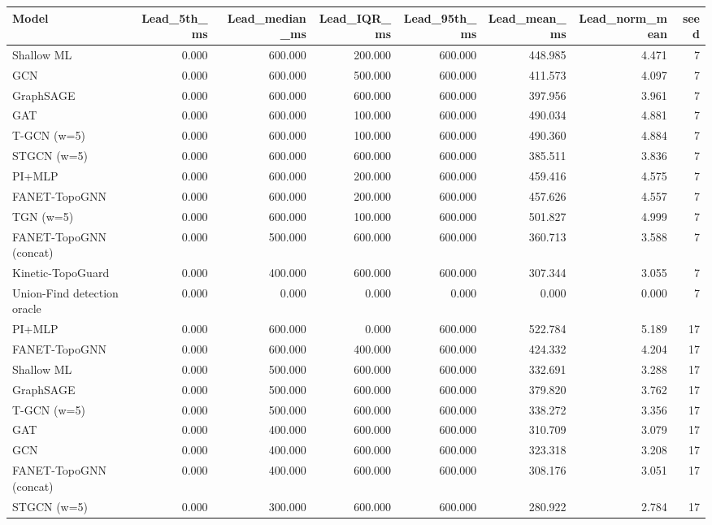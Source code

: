 \begin{tabular}{lrrrrrrr}
\toprule
Model & Lead\_5th\_ms & Lead\_median\_ms & Lead\_IQR\_ms & Lead\_95th\_ms & Lead\_mean\_ms & Lead\_norm\_mean & seed \\
\midrule
Shallow ML & 0.000 & 600.000 & 200.000 & 600.000 & 448.985 & 4.471 & 7 \\
GCN & 0.000 & 600.000 & 500.000 & 600.000 & 411.573 & 4.097 & 7 \\
GraphSAGE & 0.000 & 600.000 & 600.000 & 600.000 & 397.956 & 3.961 & 7 \\
GAT & 0.000 & 600.000 & 100.000 & 600.000 & 490.034 & 4.881 & 7 \\
T-GCN (w=5) & 0.000 & 600.000 & 100.000 & 600.000 & 490.360 & 4.884 & 7 \\
STGCN (w=5) & 0.000 & 600.000 & 600.000 & 600.000 & 385.511 & 3.836 & 7 \\
PI+MLP & 0.000 & 600.000 & 200.000 & 600.000 & 459.416 & 4.575 & 7 \\
FANET-TopoGNN & 0.000 & 600.000 & 200.000 & 600.000 & 457.626 & 4.557 & 7 \\
TGN (w=5) & 0.000 & 600.000 & 100.000 & 600.000 & 501.827 & 4.999 & 7 \\
FANET-TopoGNN (concat) & 0.000 & 500.000 & 600.000 & 600.000 & 360.713 & 3.588 & 7 \\
Kinetic-TopoGuard & 0.000 & 400.000 & 600.000 & 600.000 & 307.344 & 3.055 & 7 \\
Union-Find detection oracle & 0.000 & 0.000 & 0.000 & 0.000 & 0.000 & 0.000 & 7 \\
PI+MLP & 0.000 & 600.000 & 0.000 & 600.000 & 522.784 & 5.189 & 17 \\
FANET-TopoGNN & 0.000 & 600.000 & 400.000 & 600.000 & 424.332 & 4.204 & 17 \\
Shallow ML & 0.000 & 500.000 & 600.000 & 600.000 & 332.691 & 3.288 & 17 \\
GraphSAGE & 0.000 & 500.000 & 600.000 & 600.000 & 379.820 & 3.762 & 17 \\
T-GCN (w=5) & 0.000 & 500.000 & 600.000 & 600.000 & 338.272 & 3.356 & 17 \\
GAT & 0.000 & 400.000 & 600.000 & 600.000 & 310.709 & 3.079 & 17 \\
GCN & 0.000 & 400.000 & 600.000 & 600.000 & 323.318 & 3.208 & 17 \\
FANET-TopoGNN (concat) & 0.000 & 400.000 & 600.000 & 600.000 & 308.176 & 3.051 & 17 \\
STGCN (w=5) & 0.000 & 300.000 & 600.000 & 600.000 & 280.922 & 2.784 & 17 \\

\end{tabular}
